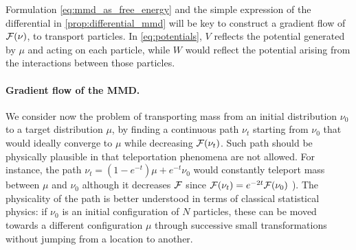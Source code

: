Formulation \cref{eq:mmd_as_free_energy} and the simple expression of the differential in \cref{prop:differential_mmd} will be key to construct a gradient flow of ${{\mathcal F}}(\nu)$, to transport particles. In \cref{eq:potentials}, $V$ reflects the potential generated by $\mu$ and acting on each particle, while $W$ would reflect the potential arising from the interactions between those particles.  %
\paragraph{Gradient flow of the MMD.}\label{paragraph:flow_MMD}
We consider now the problem of transporting mass from an initial distribution $\nu_0$ to a target distribution $\mu$, by finding a continuous path $\nu_t$ starting from $\nu_0$ that would ideally converge to $\mu$ while decreasing ${{\mathcal F}}(\nu_t)$. Such path should be physically plausible in that  teleportation phenomena are not allowed. For instance, the path $\nu_t = (1-e^{-t})\mu + e^{-t}\nu_0$ would constantly teleport mass between $\mu$ and $\nu_0$ although it decreases  ${{\mathcal F}}$ since ${{\mathcal F}}(\nu_t)=e^{-2t}{{\mathcal F}}(\nu_0)$ \cite[Corollary 1]{mroueh2018regularized}). The physicality of the path is better understood in terms of classical statistical physics: if $\nu_0$ is an initial configuration of $N$ particles, these can be moved towards a different configuration $\mu$ through successive small transformations without jumping from a location to another. %

